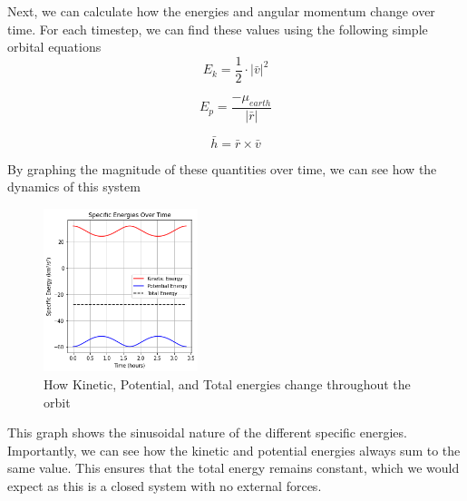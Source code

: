 \documentclass[12pt,twocolumn]{article}  %
\begin{document}
Next, we can calculate how the energies and angular momentum change over time. For each timestep, we can find these values using the following simple orbital equations
\setcounter{equation}{0}
\begin{equation}
E_{k} = \frac{1}{2} \cdot |\bar{v}|^{2}
\end{equation}

\begin{equation}
E_{p} = \frac{-\mu_{earth}}{|\bar{r}|}
\end{equation}

\begin{equation}
\bar{h} = \bar{r} \times \bar{v}
\end{equation}

By graphing the magnitude of these quantities over time, we can see how the dynamics of this system
\vspace{0.2cm}
\begin{figure}[H]
    \centering
    \includegraphics[width=0.4\textwidth]{Images/124-energies.png}
    \caption{How Kinetic, Potential, and Total energies change throughout the orbit }
\end{figure}

This graph shows the sinusoidal nature of the different specific energies. Importantly, we can see how the 
kinetic and potential energies always sum to the same value. This ensures that the total energy remains constant, which we would expect 
as this is a closed system with no external forces. 
\end{document}

